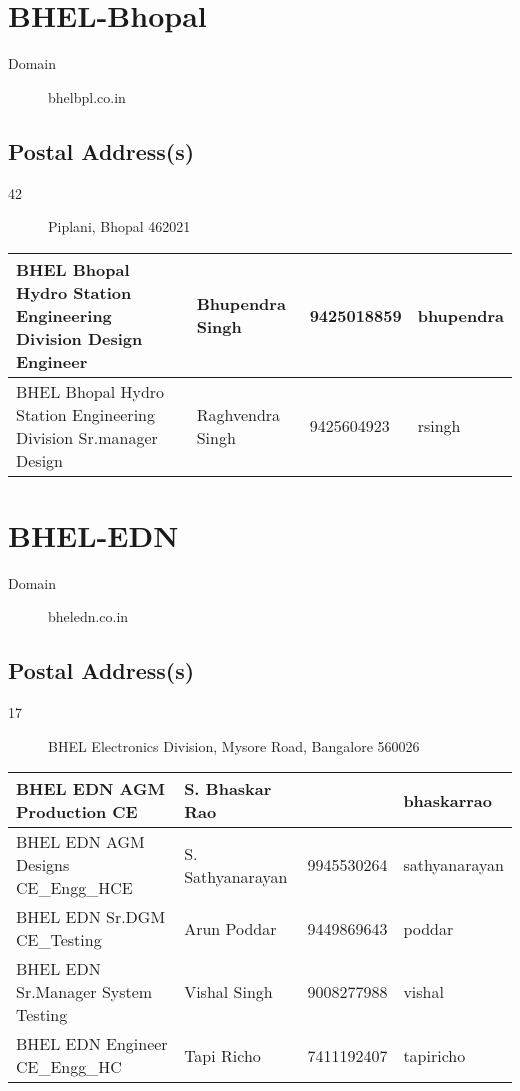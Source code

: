 \documentclass[a4paper, 11pt, twoside]{book}
\begin{document}
\section{BHEL-Bhopal}\label{com:31}
\begin{description}
\item[Domain]bhelbpl.co.in
\end{description}
\subsection*{Postal Address(s)}
\begin{description}
\item [42]Piplani, Bhopal 462021
\end{description}
\begin{tabular}{|p{4cm}|p{2cm}|p{2cm}|p{3cm}|}
\hline
BHEL Bhopal Hydro Station Engineering Division Design Engineer & Bhupendra Singh & 9425018859 & bhupendra \\ \hline
BHEL Bhopal Hydro Station Engineering Division Sr.manager Design & Raghvendra Singh & 9425604923 & rsingh \\ \hline
\end{tabular}
\section{BHEL-EDN}\label{com:19}
\begin{description}
\item[Domain]bheledn.co.in
\end{description}
\subsection*{Postal Address(s)}
\begin{description}
\item [17]BHEL Electronics Division, Mysore Road, Bangalore 560026
\end{description}
\begin{tabular}{|p{4cm}|p{2cm}|p{2cm}|p{3cm}|}
\hline
BHEL EDN AGM Production CE & S. Bhaskar Rao &  & bhaskarrao \\ \hline
BHEL EDN AGM Designs CE\_Engg\_HCE & S. Sathyanarayan & 9945530264 & sathyanarayan \\ \hline
BHEL EDN Sr.DGM CE\_Testing & Arun Poddar & 9449869643 & poddar \\ \hline
BHEL EDN Sr.Manager System Testing & Vishal Singh & 9008277988 & vishal \\ \hline
BHEL EDN Engineer CE\_Engg\_HC & Tapi Richo & 7411192407 & tapiricho \\ \hline
\end{tabular}
\end{document}
